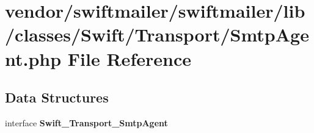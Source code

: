 \section{vendor/swiftmailer/swiftmailer/lib/classes/\+Swift/\+Transport/\+Smtp\+Agent.php File Reference}
\label{_smtp_agent_8php}
\subsection*{Data Structures}
\begin{DoxyCompactItemize}
\item 
interface {\bf Swift\+\_\+\+Transport\+\_\+\+Smtp\+Agent}
\end{DoxyCompactItemize}

